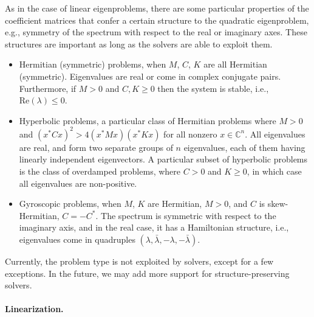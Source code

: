 As in the case of linear eigenproblems, there are some particular properties of the coefficient matrices that confer a certain structure to the quadratic eigenproblem, e.g., symmetry of the spectrum with respect to the real or imaginary axes. These structures are important as long as the solvers are able to exploit them.
\begin{itemize}
\item Hermitian (symmetric) problems, when $M$, $C$, $K$ are all Hermitian (symmetric). Eigenvalues are real or come in complex conjugate pairs. Furthermore, if $M>0$ and $C,K\geq 0$ then the system is stable, i.e., $\text{Re}(\lambda)\leq 0$.
\item Hyperbolic problems, a particular class of Hermitian problems where $M>0$ and $(x^*Cx)^2>4(x^*Mx)(x^*Kx)$ for all nonzero $x\in\mathbb{C}^n$. All eigenvalues are real, and form two separate groups of $n$ eigenvalues, each of them having linearly independent eigenvectors.
A particular subset of hyperbolic problems is the class of overdamped problems, where $C>0$ and $K\geq 0$, in which case all eigenvalues are non-positive.
\item Gyroscopic problems, when $M$, $K$ are Hermitian, $M>0$, and $C$ is skew-Hermitian, $C=-C^*$. The spectrum is symmetric with respect to the imaginary axis, and in the real case, it has a Hamiltonian structure, i.e., eigenvalues come in quadruples $(\lambda,\bar{\lambda},-\lambda,-\bar{\lambda})$.
\end{itemize}
Currently, the problem type is not exploited by  solvers, except for a few exceptions. In the future, we may add more support for structure-preserving solvers.

\paragraph{Linearization.}

